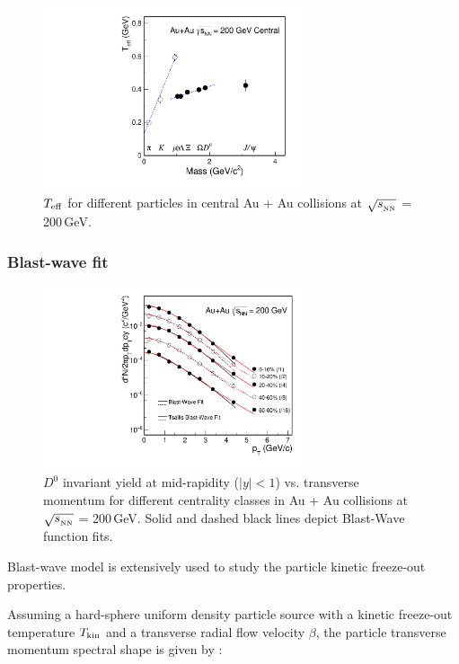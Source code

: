 \begin{figure}
\centering
\includegraphics[width=0.68\textwidth]{figure/Run14_D0HFT/Teff_ALL.pdf}
\caption{$T_{\rm eff}$ for different particles in central Au + Au collisions at $\sqrt{s_{_{\rm NN}}}$ = 200\,GeV.}
\label{figure:Teff_ALL} 
\end{figure}


\subsubsection{\label{result:collectivity:BW}Blast-wave fit}

\begin{figure}
\centering
\includegraphics[width=0.68\textwidth]{figure/Run14_D0HFT/BWFit.pdf}
\caption{$D^{0}$ invariant yield at mid-rapidity ($|y|<1$) vs. transverse momentum for different centrality classes in Au + Au collisions at $\sqrt{s_{_{\rm NN}}}$ = 200\,GeV. Solid and dashed black lines depict Blast-Wave function fits.}
\label{figure:Teff_ALL} 
\end{figure}


Blast-wave model is extensively used to study the particle kinetic freeze-out properties. 

Assuming a hard-sphere uniform density particle source with a kinetic freeze-out temperature $T_{\rm kin}$ and a transverse radial flow velocity $\beta$, the particle transverse momentum spectral shape is given by :

